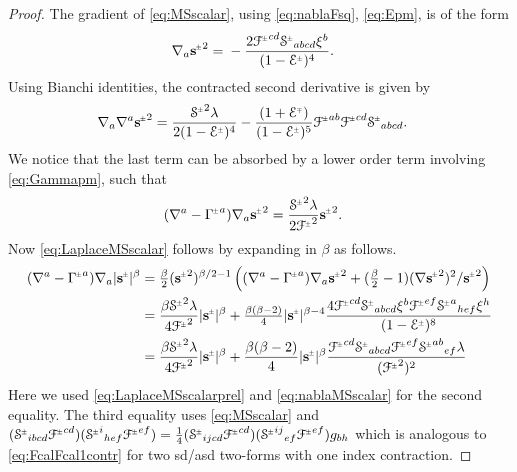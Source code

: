 \documentclass[a4paper,11pt,reqno]{amsart}
\newcommand{\Scal}{\mathop{\rm Scal}}
\theoremstyle{plain}
\newcommand{\PM}[1]{{{#1}^{\hspace{-.5pt}\scaleto{\pm}{3.5pt}}}}
\newcommand{\MP}[1]{{{#1}^{\hspace{-.5pt}\scaleto{\mp}{3.5pt}}}}
\def\Fcal{\mathcal{F}}
\def\Ecal{\mathcal{E}}
\def\Scal{\mathcal{S}}
\def\sbold{\mathbf{s}}
\numberwithin{equation}{section}
\begin{document}
\begin{proof}
The gradient of \eqref{eq:MSscalar}, using  \eqref{eq:nablaFsq}, \eqref{eq:Epm}, is of the form
\begin{align} \label{eq:nablaMSscalar}
\nabla_{a}\PM{\sbold}^2 ={}& - \frac{2 \PM{\Fcal}^{cd} \PM{\Scal}_{abcd} \xi^{b}}{(1 - \PM{\Ecal})^4}.
\end{align}
Using Bianchi identities, the contracted second derivative is given by 
\begin{align}\label{eq:MSid}
\nabla_{a}\nabla^{a}\PM{\sbold}^2={}& \frac{ \PM{\Scal}^2 \lambda}{2 (1 - \PM{\Ecal})^4} - \frac{ (1 +  \MP{\Ecal})}{ (1 - \PM{\Ecal})^5} \PM{\Fcal}^{ab} \PM{\Fcal}^{cd} \PM{\Scal}_{abcd}.
\end{align}
We notice that the last term can be absorbed by a lower order term involving \eqref{eq:Gammapm}, such that
\begin{align} \label{eq:LaplaceMSscalarprel}
(\nabla^{a} - \PM{\Gamma}^{a}) \nabla_{a}\PM{\sbold}^2 ={}&\frac{\PM{\Scal}^2 \lambda}{2 \PM{\Fcal}^2} \PM{\sbold}^2.
\end{align}
Now \eqref{eq:LaplaceMSscalar} follows by expanding in $\beta$ as follows.
\begin{align*} 
(\nabla^{a} - \PM{\Gamma}^{a}) \nabla_{a}|\PM{\sbold}|^\beta ={}& \tfrac{\beta}{2} (\PM{\sbold}^2)^{\beta/2-1} \left((\nabla^{a} - \PM{\Gamma}^{a}) \nabla_{a}\PM{\sbold}^2 + (\tfrac{\beta}{2} - 1)   (\nabla\PM{\sbold}^2 )^2 / \PM{\sbold}^{2}\right) \\
={}& \frac{\beta \PM{\Scal}^2 \lambda}{4 \PM{\Fcal}^2} |\PM{\sbold}|^\beta + \tfrac{\beta(\beta-2)}{4} |\PM{\sbold}|^{\beta-4} \frac{4 \PM{\Fcal}^{cd} \PM{\Scal}_{abcd} \xi^{b}\PM{\Fcal}^{ef} \PM{\Scal}^a{}_{hef} \xi^{h}}{(1 - \PM{\Ecal})^8} \\
={}& \frac{\beta \PM{\Scal}^2 \lambda}{4 \PM{\Fcal}^2} |\PM{\sbold}|^\beta + 
\frac{\beta(\beta-2)}{4} |\PM{\sbold}|^{\beta} \frac{ \PM{\Fcal}^{cd} \PM{\Scal}_{abcd} \PM{\Fcal}^{ef} \PM{\Scal}^{ab}{}_{ef} \lambda}{(\PM{\Fcal}^2)^2} \
\end{align*}
Here we used \eqref{eq:LaplaceMSscalarprel} and \eqref{eq:nablaMSscalar} for the second equality. The third equality uses \eqref{eq:MSscalar} and
$ (\PM{\Scal}_{ibcd}\PM{\Fcal}^{cd}) (\PM{\Scal}^i{}_{hef}\PM{\Fcal}^{ef}) = \frac{1}{4} (\PM{\Scal}_{ijcd}\PM{\Fcal}^{cd} )(  \PM{\Scal}^{ij}{}_{ef}\PM{\Fcal}^{ef}) g_{bh}$ which is analogous to \eqref{eq:FcalFcal1contr} for two sd/asd two-forms with one index contraction.
\end{proof}
\end{document}
